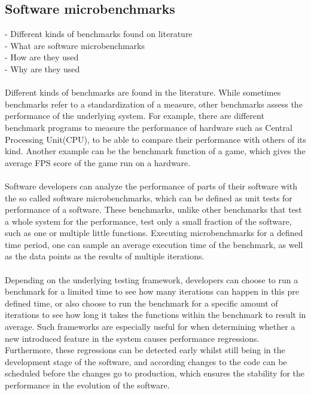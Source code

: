 \documentclass{seal_thesis}
\begin{document}
\subsection{Software microbenchmarks}
- Different kinds of benchmarks found on literature \\
- What are software microbenchmarks \\
- How are they used \\
- Why are they used \\
\\
Different kinds of benchmarks are found in the literature. While sometimes benchmarks refer to a standardization of a measure, other benchmarks assess the performance of the underlying system. For example, there are different benchmark programs to measure the performance of hardware such as Central Processing Unit(CPU), to be able to compare their performance with others of its kind. Another example can be the benchmark function of a game, which gives the average FPS score of the game run on a hardware.\\
\\
Software developers can analyze the performance of parts of their software with the so called software microbenchmarks, which can be defined as unit tests for performance of a software. These benchmarks, unlike other benchmarks that test a whole system for the performance, test only a small fraction of the software, such as one or multiple little functions. Executing microbenchmarks for a defined time period, one can sample an average execution time of the benchmark, as well as the data points as the results of multiple iterations.\\
\\
Depending on the underlying testing framework, developers can choose to run a benchmark for a limited time to see how many iterations can happen in this pre defined time, or also choose to run the benchmark for a specific amount of iterations to see how long it takes the functions within the benchmark to result in average. Such frameworks are especially useful for when determining whether a new introduced feature in the system causes performance regressions. Furthermore, these regressions can be detected early whilst still being in the development stage of the software, and according changes to the code can be scheduled before the changes go to production, which ensures the stability for the performance in the evolution of the software.
\end{document}
